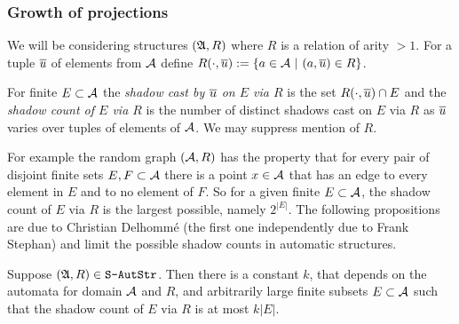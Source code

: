 \subsubsection*{Growth of projections}

We will be considering structures $(\mathfrak{A},R)$ where $R$ is a relation of arity $> 1$. For a tuple $\mbox{$\overline {u}$}$ of elements from ${\mathcal A}$ define
$R(\cdot,\mbox{$\overline {u}$}) := \{a \in {\mathcal A} \ \vert \  (a,\mbox{$\overline {u}$}) \in R\}$.

\begin{definition}
For finite $E \subset {\mathcal A}$ the  {\em shadow cast by $\mbox{$\overline {u}$}$ on $E$ via $R$} is the set 
$R(\cdot,\mbox{$\overline {u}$}) \cap E$ and the {\em shadow count of $E$ via $R$} is the number of distinct shadows
cast on $E$ via $R$ as $\mbox{$\overline {u}$}$ varies over tuples of elements of ${\mathcal A}$. We may suppress mention of $R$.
\end{definition}

For example the random graph $({\mathcal A},R)$ has the property that for every pair of disjoint finite sets $E,F \subset {\mathcal A}$ there is a point $x \in {\mathcal A}$ that has an edge to every element in $E$ and to no element of $F$. So for a given finite $E \subset {\mathcal A}$, the shadow count of $E$ via $R$ is 
the largest possible, namely $2^{|E|}$. The following propositions are due to Christian Delhomm{\'e} \cite{Delh04} (the first one independently due to Frank Stephan) and limit the possible shadow counts in automatic structures.

\begin{proposition}
Suppose $(\mathfrak{A},R) \in \mbox{\tt S-AutStr}$.
Then there is a constant $k$,  that depends on the automata for domain ${{\mathcal A}}$ and $R$, and arbitrarily large finite subsets $E \subset {{\mathcal A}}$ such
that the shadow count of $E$ via $R$ is at most $k|E|$.
\end{proposition}

